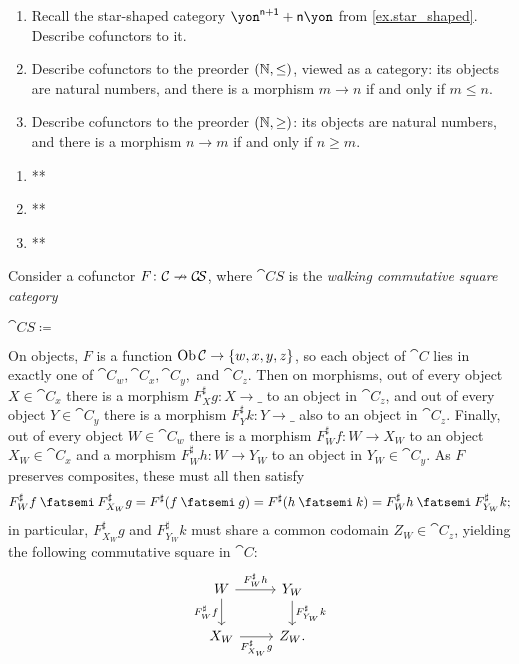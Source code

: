 \documentclass[Book-Poly]{subfiles}
\begin{document}
\begin{exercise}
\begin{enumerate}
	\item Recall the star-shaped category ${\yon}^{\ord{n}+\1}+\ord{n}\yon$ from \cref{ex.star_shaped}. Describe cofunctors to it.
	\item Describe cofunctors to the preorder $(\mathbb{N},\leq)$, viewed as a category: its objects are natural numbers, and there is a morphism $m\to n$ if and only if $m\leq n$.
	\item Describe cofunctors to the preorder $(\mathbb{N},\geq)$: its objects are natural numbers, and there is a morphism $n\to m$ if and only if $n\geq m$.
\qedhere
\end{enumerate}
\begin{solution}
\begin{enumerate}
    \item **
    \item **
    \item **
\end{enumerate}
\end{solution}
\end{exercise}

\begin{example} \label{ex.cof_to_comm_sq}
Consider a cofunctor $F\colon\mathcal{C}\nrightarrow\mathcal{C\!S}$, where $\cat{C\!S}$ is the \emph{walking commutative square category}
\begin{center}
    $\cat{C\!S}\coloneqq\:$
\end{center}
On objects, $F$ is a function $\operatorname{Ob}\mathcal{C}\to\{w,x,y,z\}$, so each object of $\cat{C}$ lies in exactly one of $\cat{C}_w,\cat{C}_x,\cat{C}_y,$ and $\cat{C}_z$.
Then on morphisms, out of every object $X\in\cat{C}_x$ there is a morphism $F^\sharp_Xg\colon X\to\_$ to an object in $\cat{C}_z$, and out of every object $Y\in\cat{C}_y$ there is a morphism $F^\sharp_Yk\colon Y\to\_$ also to an object in $\cat{C}_z$.
Finally, out of every object $W\in\cat{C}_w$ there is a morphism $F^\sharp_Wf\colon W\to X_W$ to an object $X_W\in\cat{C}_x$ and a morphism $F^\sharp_Wh\colon W\to Y_W$ to an object in $Y_W\in\cat{C}_y$.
As $F$ preserves composites, these must all then satisfy
\[
    F^\sharp_Wf\then F^\sharp_{X_W}g=F^\sharp(f\then g)=F^\sharp(h\then k)=F^\sharp_Wh\then F^\sharp_{Y_W}k;
\]
in particular, $F^\sharp_{X_W}g$ and $F^\sharp_{Y_W}k$ must share a common codomain $Z_W\in\cat{C}_z$, yielding the following commutative square in $\cat{C}$:
\[
\begin{tikzcd}[ampersand replacement=\&]
    W\ar[d,"F^\sharp_Wf"']\ar[r,"F^\sharp_Wh"] \& Y_W\ar[d,"F^\sharp_{Y_W}k"] \\
    X_W\ar[r,"F^\sharp_{X_W}g"'] \& Z_W.
\end{tikzcd}
\]
\end{example}
\end{document}
